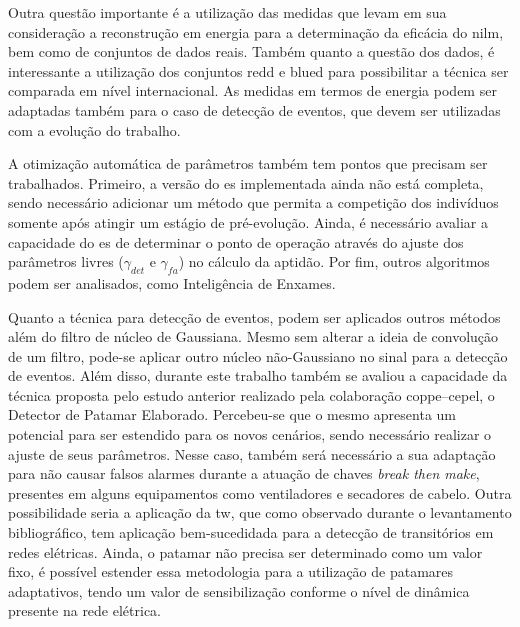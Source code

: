 Outra questão importante é a utilização das medidas que levam em sua
consideração a reconstrução em energia para a determinação da eficácia
do \acs{nilm}, bem como de conjuntos de dados reais. Também quanto a
questão dos dados, é interessante a utilização dos conjuntos
\acs{redd} e \acs{blued} para possibilitar a técnica ser comparada em
nível internacional. As medidas em termos de energia podem ser
adaptadas também para o caso de detecção de eventos, que devem ser
utilizadas com a evolução do trabalho.

A otimização automática de parâmetros também tem pontos que precisam
ser trabalhados. Primeiro, a versão do \acs{es} implementada ainda não
está completa, sendo necessário adicionar um método que permita a
competição dos indivíduos somente após atingir um estágio de
pré-evolução. Ainda, é necessário avaliar a capacidade do \acs{es} de
determinar o ponto de operação através do ajuste dos parâmetros livres
($\gamma_{det}$ e $\gamma_{fa}$) no cálculo da aptidão. Por
fim, outros algoritmos podem ser analisados, como Inteligência de
Enxames.

Quanto a técnica para detecção de eventos, podem ser aplicados outros
métodos além do filtro de núcleo de Gaussiana. Mesmo sem alterar a
ideia de convolução de um filtro, pode-se aplicar outro núcleo
não-Gaussiano no sinal para a detecção de eventos. Além disso,
durante este trabalho também se avaliou a capacidade da técnica
proposta pelo estudo anterior realizado pela colaboração
\acs{coppe}--\acs{cepel}, o Detector de Patamar Elaborado.
Percebeu-se que o mesmo apresenta um potencial para ser estendido para
os novos cenários, sendo necessário realizar o ajuste de seus
parâmetros. Nesse caso, também será necessário a sua adaptação para
não causar falsos alarmes durante a atuação de chaves \emph{break then
make}, presentes em alguns equipamentos como ventiladores e secadores
de cabelo. Outra possibilidade seria a aplicação da \acl{tw}, que como
observado durante o levantamento bibliográfico, tem aplicação
bem-sucedidada para a detecção de transitórios em redes elétricas.
Ainda, o patamar não precisa ser determinado como um valor fixo, é
possível estender essa metodologia para a utilização de patamares
adaptativos, tendo um valor de sensibilização conforme o nível de
dinâmica presente na rede elétrica.



